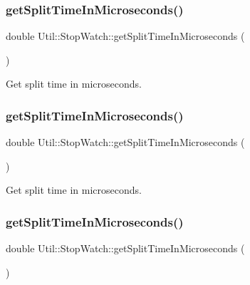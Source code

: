 \subsubsection{\texorpdfstring{getSplitTimeInMicroseconds()}{getSplitTimeInMicroseconds()}\hspace{0.1cm}{\footnotesize\ttfamily [1/3]}}
{\footnotesize\ttfamily double Util\+::\+Stop\+Watch\+::get\+Split\+Time\+In\+Microseconds (\begin{DoxyParamCaption}{ }\end{DoxyParamCaption})}



Get split time in microseconds. 

\mbox{\label{classUtil_1_1StopWatch_a5901023b831c6670d4184a9c6e85ff75}} 
\subsubsection{\texorpdfstring{getSplitTimeInMicroseconds()}{getSplitTimeInMicroseconds()}\hspace{0.1cm}{\footnotesize\ttfamily [2/3]}}
{\footnotesize\ttfamily double Util\+::\+Stop\+Watch\+::get\+Split\+Time\+In\+Microseconds (\begin{DoxyParamCaption}{ }\end{DoxyParamCaption})}



Get split time in microseconds. 

\mbox{\label{classUtil_1_1StopWatch_a5901023b831c6670d4184a9c6e85ff75}} 
\subsubsection{\texorpdfstring{getSplitTimeInMicroseconds()}{getSplitTimeInMicroseconds()}\hspace{0.1cm}{\footnotesize\ttfamily [3/3]}}
{\footnotesize\ttfamily double Util\+::\+Stop\+Watch\+::get\+Split\+Time\+In\+Microseconds (\begin{DoxyParamCaption}{ }\end{DoxyParamCaption})}



